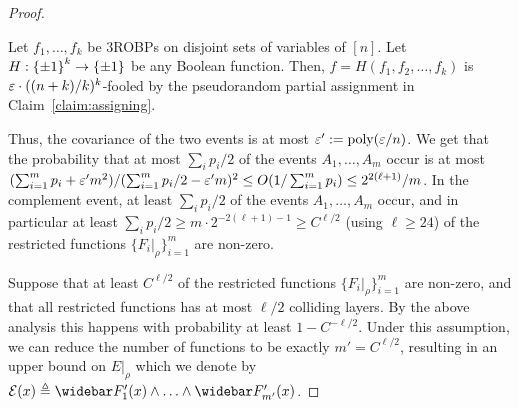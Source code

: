 \begin{proof}
\begin{lemma}\label{lemma:fooling H of width-3}
Let $f_1, \ldots, f_k$ be 3ROBPs on disjoint sets of variables of $[n]$. 
Let $H:{\{\pm1\}}^k \to {\{\pm1\}}$ be any Boolean function.
Then, $f = H(f_1, f_2, \ldots, f_k)$ is $\varepsilon\cdot ((n+k)/k)^k$-fooled by the pseudorandom partial assignment in Claim~\ref{claim:assigning}.
\end{lemma}
	Thus, the covariance of the two events is at most $\varepsilon' := {\mathrm{poly}}(\varepsilon/n)$.	
	We get that the probability that at most $\sum_{i}{p_i/2}$ of the events $A_1, \ldots, A_m$ occur is at most 
	$(\sum_{i=1}^{m} {p_i} + \varepsilon' m^2)/(\sum_{i=1}^{m}p_i/2 - \varepsilon' m)^2 \le O(1/\sum_{i=1}^{m}p_i) \le  2^{2(\ell+1)}/m$.
	In the complement event, at least $\sum_{i}{p_i/2}$ of the events $A_1, \ldots, A_m$ occur, and in particular at least $\sum_{i}{p_i/2} \ge m \cdot 2^{-2(\ell+1)-1} \ge C^{\ell/2}$ (using $\ell \ge 24$) of the restricted functions $\{F_i|_\rho\}_{i=1}^m$ are non-zero. 

Suppose that at least $C^{\ell/2}$ of the restricted functions $\{F_i|_\rho\}_{i=1}^m$ are non-zero, and that all restricted functions has at most $\ell/2$ colliding layers. By the above analysis this happens with probability at least $1-C^{-\ell/2}$. Under this assumption, we can reduce the number of functions to be exactly $m' = C^{\ell/2}$, resulting in an upper bound on $E|_{\rho}$ which we denote by $\mE(x) \triangleq \bar{F'_{1}(x)} \wedge \ldots \wedge \bar{F'_{m'}(x)} $.
%
	\end{proof}

